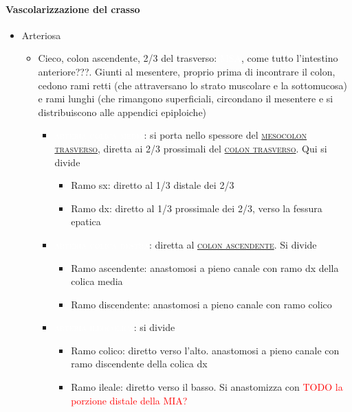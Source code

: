 \documentclass[italian,]{article}
\providecommand{\tightlist}{%
  \setlength{\itemsep}{0pt}\setlength{\parskip}{0pt}}
\newcommand{\art}[1]{\colorbox{RedOrange}{\textcolor{white}{\textsc{#1}}}}
\renewcommand{\a}[1]{\underline{\textsc{#1}}}
\newcommand{\TODO}[1]{\textcolor{red}{\textsf{\footnotesize{TODO #1}}}} %
\begin{document}
\hypertarget{vascolarizzazione-del-crasso}{%
\paragraph{Vascolarizzazione del
crasso}\label{vascolarizzazione-del-crasso}}

\begin{itemize}
\tightlist
\item
  Arteriosa

  \begin{itemize}
  \tightlist
  \item
    Cieco, colon ascendente, 2/3 del trasverso: \art{MSA}, come tutto
    l'intestino anteriore???. Giunti al mesentere, proprio prima di
    incontrare il colon, cedono rami retti (che attraversano lo strato
    muscolare e la sottomucosa) e rami lunghi (che rimangono
    superficiali, circondano il mesentere e si distribuiscono alle
    appendici epiploiche)

    \begin{itemize}
    \tightlist
    \item
      \art{arteria colica media}: si porta nello spessore del
      \a{mesocolon trasverso}, diretta ai 2/3 prossimali del
      \a{colon trasverso}. Qui si divide

      \begin{itemize}
      \tightlist
      \item
        Ramo sx: diretto al 1/3 distale dei 2/3
      \item
        Ramo dx: diretto al 1/3 prossimale dei 2/3, verso la fessura
        epatica
      \end{itemize}
    \item
      \art{arteria colica destra}: diretta al \a{colon ascendente}. Si
      divide

      \begin{itemize}
      \tightlist
      \item
        Ramo ascendente: anastomosi a pieno canale con ramo dx della
        colica media
      \item
        Ramo discendente: anastomosi a pieno canale con ramo colico
      \end{itemize}
    \item
      \art{arteria ileocolica}: si divide

      \begin{itemize}
      \tightlist
      \item
        Ramo colico: diretto verso l'alto. anastomosi a pieno canale con
        ramo discendente della colica dx
      \item
        Ramo ileale: diretto verso il basso. Si anastomizza con
        \TODO{la porzione distale della MIA?}


\end{itemize}
\end{itemize}
\end{itemize}
\end{itemize}
\end{document}
